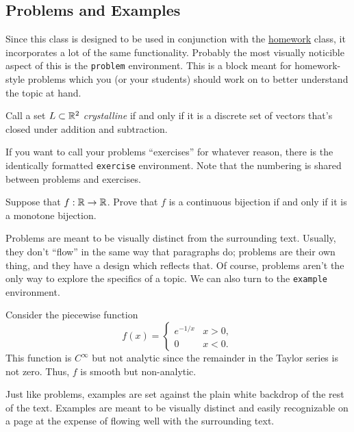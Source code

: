 \documentclass{notes}
\begin{document}
	\subsection{Problems and Examples}
	Since this class is designed to be used in conjunction with the \href{https://www.github.com/jopetty/homework}{homework} class, it incorporates a lot of the same functionality.
	Probably the most visually noticible aspect of this is the \texttt{problem} environment.
	This is a block meant for homework-style problems which you (or your students) should work on to better understand the topic at hand.
	\begin{problem}
		Call a set $L \subset \mathbb{R}^2$ \emph{crystalline} if and only if it is a discrete set of vectors that's closed under addition and subtraction.
	\end{problem}
	If you want to call your problems ``exercises'' for whatever reason, there is the identically formatted \texttt{exercise} environment. Note that the numbering is shared between problems and exercises.
	\begin{exercise}
		Suppose that $f : \mathbb{R} \to \mathbb{R}$. Prove that $f$ is a continuous bijection if and only if it is a monotone bijection.
	\end{exercise}
	Problems are meant to be visually distinct from the surrounding text. Usually, they don't ``flow'' in the same way that paragraphs do; problems are their own thing, and they have a design which reflects that. Of course, problems aren't the only way to explore the specifics of a topic. We can also turn to the \texttt{example} environment.
	\begin{example}
		Consider the piecewise function 
		\[ f(x) = \begin{cases} e^{-1/x} & x > 0, \\ 0 & x < 0. \end{cases} \]
		This function is $C^\infty$ but not analytic since the remainder in the Taylor series is not zero. Thus, $f$ is smooth but non-analytic.
	\end{example}
	Just like problems, examples are set against the plain white backdrop of the rest of the text.
	Examples are meant to be visually distinct and easily recognizable on a page at the expense of flowing well with the surrounding text.
\end{document}
